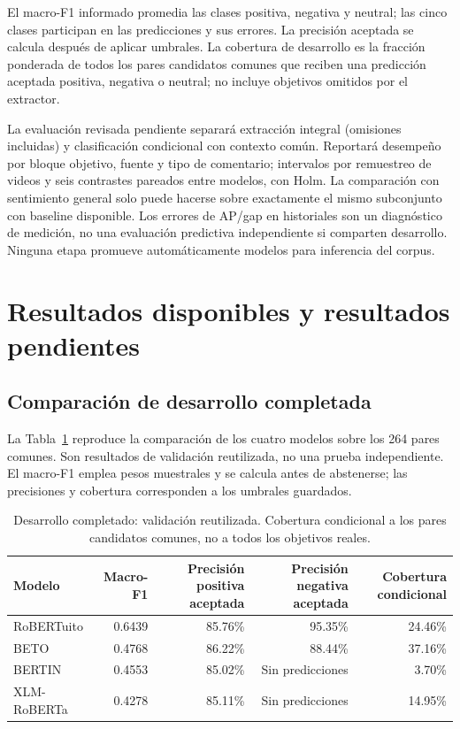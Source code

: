 \documentclass[conference,letterpaper]{IEEEtran}
\begin{document}
El macro-F1 informado promedia las clases positiva, negativa y neutral; las cinco clases participan en las predicciones y sus errores. La precisión aceptada se calcula después de aplicar umbrales. La cobertura de desarrollo es la fracción ponderada de todos los pares candidatos comunes que reciben una predicción aceptada positiva, negativa o neutral; no incluye objetivos omitidos por el extractor.

La evaluación revisada pendiente separará extracción integral (omisiones incluidas) y clasificación condicional con contexto común. Reportará desempeño por bloque objetivo, fuente y tipo de comentario; intervalos por remuestreo de videos y seis contrastes pareados entre modelos, con Holm. La comparación con sentimiento general solo puede hacerse sobre exactamente el mismo subconjunto con baseline disponible. Los errores de AP/gap en historiales son un diagnóstico de medición, no una evaluación predictiva independiente si comparten desarrollo. Ninguna etapa promueve automáticamente modelos para inferencia del corpus.

\section{Resultados disponibles y resultados pendientes}
\subsection{Comparación de desarrollo completada}
La Tabla~\ref{tab:modelos} reproduce la comparación de los cuatro modelos sobre los 264 pares comunes. Son resultados de validación reutilizada, no una prueba independiente. El macro-F1 emplea pesos muestrales y se calcula antes de abstenerse; las precisiones y cobertura corresponden a los umbrales guardados.

\begin{table}[t]
\centering
\caption{Desarrollo completado: validación reutilizada. Cobertura condicional a los pares candidatos comunes, no a todos los objetivos reales.}
\label{tab:modelos}
\begin{tabular}{lrrrr}
\toprule
Modelo & Macro-F1 & Precisión positiva aceptada & Precisión negativa aceptada & Cobertura condicional\\\midrule
RoBERTuito & 0.6439 & 85.76\% & 95.35\% & 24.46\%\\
BETO & 0.4768 & 86.22\% & 88.44\% & 37.16\%\\
BERTIN & 0.4553 & 85.02\% & Sin predicciones & 3.70\%\\
XLM-RoBERTa & 0.4278 & 85.11\% & Sin predicciones & 14.95\%\\\bottomrule
\end{tabular}
\end{table}
\end{document}
